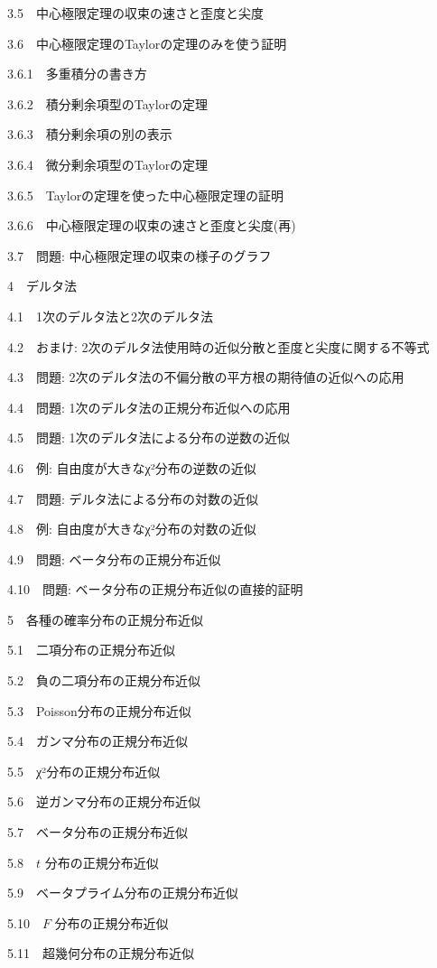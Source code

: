 \documentclass[10pt, a4paper,xelatex,ja=standard]{bxjsarticle}
\begin{document}
{{3.5~~}中心極限定理の収束の速さと歪度と尖度}

{{3.6~~}中心極限定理のTaylorの定理のみを使う証明}

{{3.6.1~~}多重積分の書き方}

{{3.6.2~~}積分剰余項型のTaylorの定理}

{{3.6.3~~}積分剰余項の別の表示}

{{3.6.4~~}微分剰余項型のTaylorの定理}

{{3.6.5~~}Taylorの定理を使った中心極限定理の証明}

{{3.6.6~~}中心極限定理の収束の速さと歪度と尖度(再)}

{{3.7~~}問題: 中心極限定理の収束の様子のグラフ}

{{4~~}デルタ法}

{{4.1~~}1次のデルタ法と2次のデルタ法}

{{4.2~~}おまけ: 2次のデルタ法使用時の近似分散と歪度と尖度に関する不等式}

{{4.3~~}問題: 2次のデルタ法の不偏分散の平方根の期待値の近似への応用}

{{4.4~~}問題: 1次のデルタ法の正規分布近似への応用}

{{4.5~~}問題: 1次のデルタ法による分布の逆数の近似}

{{4.6~~}例: 自由度が大きなχ²分布の逆数の近似}

{{4.7~~}問題: デルタ法による分布の対数の近似}

{{4.8~~}例: 自由度が大きなχ²分布の対数の近似}

{{4.9~~}問題: ベータ分布の正規分布近似}

{{4.10~~}問題: ベータ分布の正規分布近似の直接的証明}

{{5~~}各種の確率分布の正規分布近似}

{{5.1~~}二項分布の正規分布近似}

{{5.2~~}負の二項分布の正規分布近似}

{{5.3~~}Poisson分布の正規分布近似}

{{5.4~~}ガンマ分布の正規分布近似}

{{5.5~~}χ²分布の正規分布近似}

{{5.6~~}逆ガンマ分布の正規分布近似}

{{5.7~~}ベータ分布の正規分布近似}

{{5.8~~}\(t\) 分布の正規分布近似}

{{5.9~~}ベータプライム分布の正規分布近似}

{{5.10~~}\(F\) 分布の正規分布近似}

{{5.11~~}超幾何分布の正規分布近似}
\end{document}

